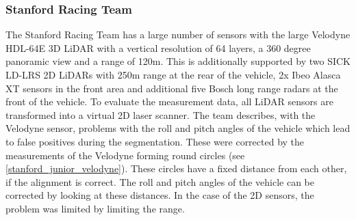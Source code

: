 \documentclass[11pt,oneside,openright]{mpreport}
\begin{document}
\subsubsection{Stanford Racing Team}


The Stanford Racing Team \cite{Montemerlo2009} has a large number of sensors with the large Velodyne HDL-64E 3D LiDAR with a vertical resolution of 64 layers, 
a 360 degree panoramic view and a range of 120m. This is additionally supported by two SICK LD-LRS 2D LiDARs with 250m range at the rear of the vehicle, 2x Ibeo Alasca XT 
sensors in the front area and additional five Bosch long range radars at the front of the vehicle. To evaluate the measurement data, all LiDAR sensors are transformed 
into a virtual 2D laser scanner. The team describes, with the Velodyne sensor, problems with the roll and pitch angles of the vehicle which lead to false positives during the
segmentation. These were corrected by the measurements of the Velodyne forming round circles (see \cref{stanford_junior_velodyne}). These circles have a fixed distance
from each other, if the alignment is correct. The roll and pitch angles of the vehicle can be corrected by looking at these distances. In the case of the 2D sensors, 
the problem was limited by limiting the range.
\end{document}
